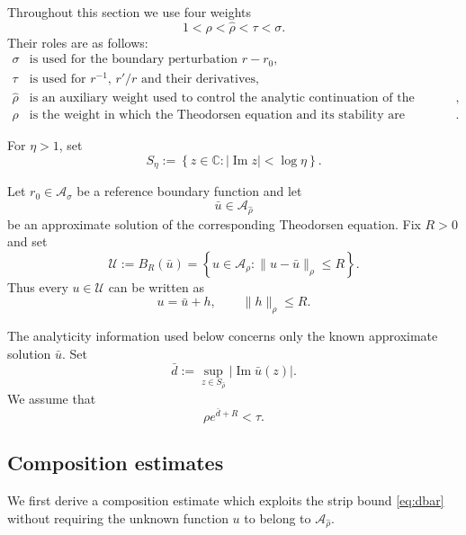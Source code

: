 \documentclass[11pt,a4paper]{amsart}
\begin{document}
Throughout this section we use four weights
\begin{equation}\label{eq:four-weights}
	1<\rho<\widehat\rho<\tau<\sigma.
\end{equation}
Their roles are as follows:
\[
\begin{array}{cl}
	\sigma
	&
	\text{is used for the boundary perturbation }r-r_0,
	\\[1mm]
	\tau
	&
	\text{is used for }r^{-1},\,r'/r
	\text{ and their derivatives},
	\\[1mm]
	\widehat\rho
	&
	\text{is an auxiliary weight used to control the analytic continuation
		of the approximate solution},
	\\[1mm]
	\rho
	&
	\text{is the weight in which the Theodorsen equation and its stability
		are validated}.
\end{array}
\]

For $\eta>1$, set
\[
S_\eta
:=
\left\{
z\in\mathbb C:
|\operatorname{Im}z|<\log\eta
\right\}.
\]

Let $r_0\in\mathcal A_\sigma$ be a reference boundary function and
let
\[
\bar u\in\mathcal A_{\widehat\rho}
\]
be an approximate solution of the corresponding Theodorsen equation.
Fix $R>0$ and set
\begin{equation}\label{eq:U}
	\mathcal U
	:=
	B_R(\bar u)
	=
	\left\{
	u\in\mathcal A_\rho:
	\|u-\bar u\|_\rho\le R
	\right\}.
\end{equation}
Thus every $u\in\mathcal U$ can be written as
\[
u=\bar u+h,
\qquad
\|h\|_\rho\le R.
\]

The analyticity information used below concerns only the known
approximate solution $\bar u$. Set
\begin{equation}\label{eq:dbar}
	\bar d
	:=
	\sup_{z\in S_{\widehat\rho}}
	|\operatorname{Im}\bar u(z)|.
\end{equation}
We assume that
\begin{equation}\label{eq:composition-margin}
	\rho e^{\bar d+R}<\tau.
\end{equation}


\subsection{Composition estimates}

We first derive a composition estimate which exploits the strip bound
\eqref{eq:dbar} without requiring the unknown function $u$ to belong
to $\mathcal A_{\widehat\rho}$.
\end{document}
